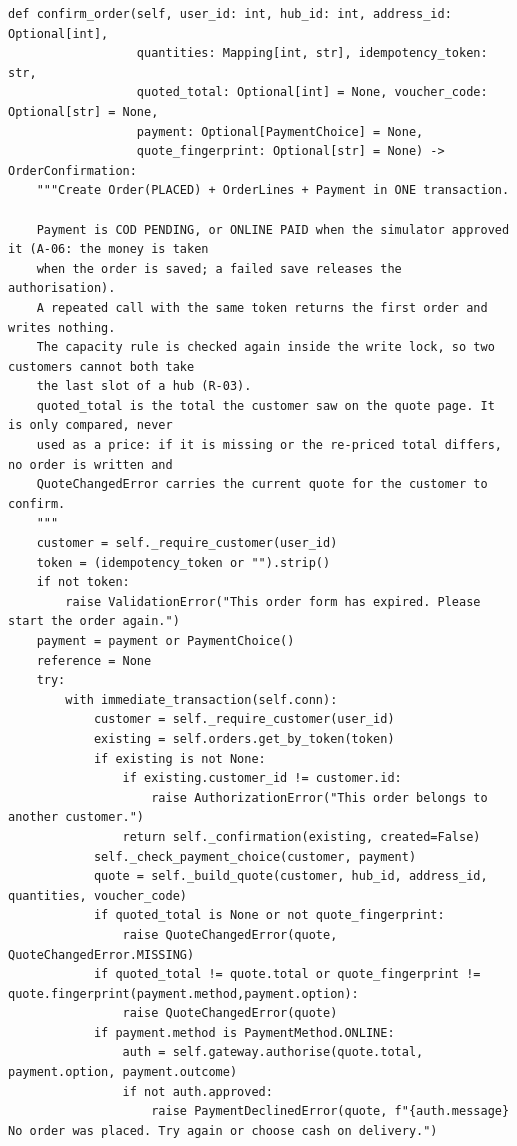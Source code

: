 \begin{lstlisting}
def confirm_order(self, user_id: int, hub_id: int, address_id: Optional[int],
                  quantities: Mapping[int, str], idempotency_token: str,
                  quoted_total: Optional[int] = None, voucher_code: Optional[str] = None,
                  payment: Optional[PaymentChoice] = None,
                  quote_fingerprint: Optional[str] = None) -> OrderConfirmation:
    """Create Order(PLACED) + OrderLines + Payment in ONE transaction.

    Payment is COD PENDING, or ONLINE PAID when the simulator approved it (A-06: the money is taken
    when the order is saved; a failed save releases the authorisation).
    A repeated call with the same token returns the first order and writes nothing.
    The capacity rule is checked again inside the write lock, so two customers cannot both take
    the last slot of a hub (R-03).
    quoted_total is the total the customer saw on the quote page. It is only compared, never
    used as a price: if it is missing or the re-priced total differs, no order is written and
    QuoteChangedError carries the current quote for the customer to confirm.
    """
    customer = self._require_customer(user_id)
    token = (idempotency_token or "").strip()
    if not token:
        raise ValidationError("This order form has expired. Please start the order again.")
    payment = payment or PaymentChoice()
    reference = None
    try:
        with immediate_transaction(self.conn):
            customer = self._require_customer(user_id)
            existing = self.orders.get_by_token(token)
            if existing is not None:
                if existing.customer_id != customer.id:
                    raise AuthorizationError("This order belongs to another customer.")
                return self._confirmation(existing, created=False)
            self._check_payment_choice(customer, payment)
            quote = self._build_quote(customer, hub_id, address_id, quantities, voucher_code)
            if quoted_total is None or not quote_fingerprint:
                raise QuoteChangedError(quote, QuoteChangedError.MISSING)
            if quoted_total != quote.total or quote_fingerprint != quote.fingerprint(payment.method,payment.option):
                raise QuoteChangedError(quote)
            if payment.method is PaymentMethod.ONLINE:
                auth = self.gateway.authorise(quote.total, payment.option, payment.outcome)
                if not auth.approved:
                    raise PaymentDeclinedError(quote, f"{auth.message} No order was placed. Try again or choose cash on delivery.")

\end{lstlisting}
